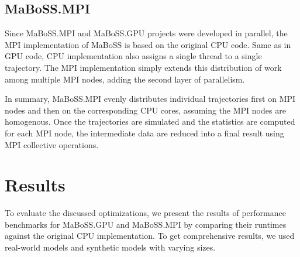 \documentclass[times, twoside]{zHenriquesLab-StyleBioRxiv}
\begin{document}
\subsection*{MaBoSS.MPI}
Since MaBoSS.MPI and MaBoSS.GPU projects were developed in parallel, the MPI implementation of MaBoSS is based on the original CPU code. Same as in GPU code, CPU implementation also assigns a single thread to a single trajectory. The MPI implementation simply extends this distribution of work among multiple MPI nodes, adding the second layer of parallelism. 

In summary, MaBoSS.MPI evenly distributes individual trajectories first on MPI nodes and then on the corresponding CPU cores, assuming the MPI nodes are homogenous. Once the trajectories are simulated and the statistics are computed for each MPI node, the intermediate data are reduced into a final result using MPI collective operations.




\section*{Results}

To evaluate the discussed optimizations, we present the results of performance benchmarks for MaBoSS.GPU and MaBoSS.MPI by comparing their runtimes against the original CPU implementation. To get comprehensive results, we used real-world models and synthetic models with varying sizes.
\end{document}
